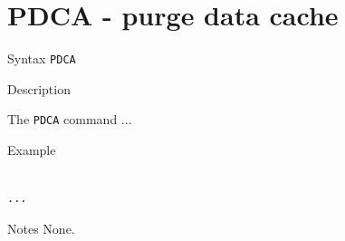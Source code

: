 %
%
\pagebreak
\section*{PDCA - purge data cache}

\begin{iPageDescEntry}{Syntax}
\texttt{PDCA } \\
\end{iPageDescEntry}

\begin{iPageDescEntry}{Description}

The \texttt{PDCA} command ...

\end{iPageDescEntry}

\begin{iPageDescOpEntry}{Example}
\begin{lstlisting}[style=iPageOpStyle]

... 

\end{lstlisting}
\end{iPageDescOpEntry}

\begin{iPageDescEntry}{Notes}
None.
\end{iPageDescEntry}
